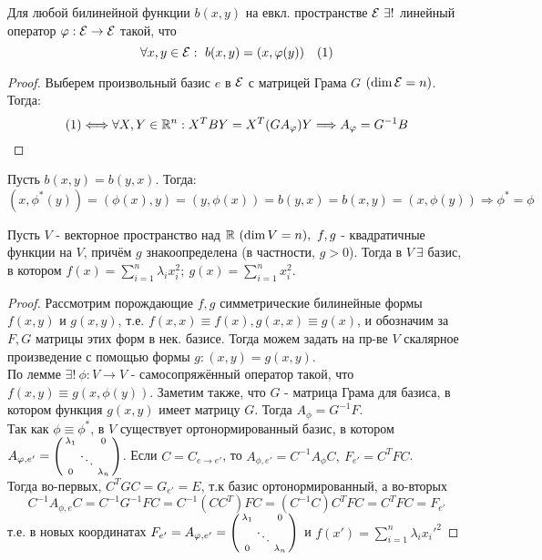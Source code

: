 \begin{lemma}
    Для любой билинейной функции $b(x, y)$ на евкл. пространстве $\mathcal{E} \ \exists!$ линейный оператор $\varphi: \mathcal{E} \rightarrow \mathcal{E}$ такой, что
    $$\forall x, y \in \mathcal{E}: \ b(x, y) = (x, \varphi(y)) \ \ \ (1)$$
\end{lemma}
\begin{proof}
    Выберем произвольный базис $e$ в $\mathcal{E}$ с матрицей Грама $G$ $(\dim \mathcal{E} = n)$. Тогда:
    $$(1) \Longleftrightarrow \forall X, Y \in \mathbb{R}^n: X^TBY = X^T(GA_{\varphi})Y \Longrightarrow A_\varphi = G^{-1}B$$ 
\end{proof}
\begin{remark}
    Пусть $b(x, y) = b(y, x)$. Тогда:
    $$(x, \phi^*(y)) = (\phi(x), y) = (y, \phi(x)) = b(y, x) = b(x, y) = (x, \phi(y)) \Rightarrow \phi^* = \phi$$
\end{remark}
\begin{theorem}
    Пусть $V$ - векторное пространство над $\mathbb{R} \ (\dim V = n), \ f, g$ - квадратичные функции на $V$, причём $g$ знакоопределена (в частности, $g > 0$). Тогда в $V \ \exists$ базис, в котором $f(x) = \sum \limits_{i=1}^n \lambda_i x_i^2; \ g(x) = \sum \limits_{i=1}^n x_i^2$. 
\end{theorem}
\begin{proof}
    Рассмотрим порождающие $f, g$ симметрические билинейные формы $f(x, y)$ и $g(x, y)$, т.е. $f(x,x) \equiv f(x), g(x, x) \equiv g(x)$, и обозначим за $F,G$ матрицы этих форм в нек. базисе. Тогда можем задать на пр-ве $V$ скалярное произведение с помощью формы $g: (x,y) = g(x,y)$.\\
    По лемме $\exists! \ \phi: V\rightarrow V$ - самосопряжённый оператор такой, что $f(x, y) \equiv g(x, \phi(y))$. Заметим также, что $G$ - матрица Грама для базиса, в котором функция $g(x, y)$ имеет матрицу $G$. Тогда $A_\phi = G^{-1}F$.\\
    Так как $\phi \equiv \phi^*$, в $V$ существует ортонормированный базис, в котором $A_{\phi, e'} = \begin{psmallmatrix}  \lambda_1&\null&0 \\ \null&\ddots&\null \\ 0&\null&\lambda_n \end{psmallmatrix}$. Если $C = C_{e\rightarrow e'}$, то $A_{\phi, e'} = C^{-1}A_\phi C, \ F_{e'} = C^TFC$.\\
    Тогда во-первых, $C^TGC = G_{e'} = E$, т.к базис ортонормированный, а во-вторых
    $$C^{-1}A_{\phi, e}C = C^{-1}G^{-1}FC = C^{-1}(CC^T)FC = (C^{-1}C)C^TFC = C^TFC = F_{e'}$$
    т.е. в новых координатах $F_{e'} = A_{\phi, e'} = \begin{psmallmatrix}  \lambda_1&\null&0 \\ \null&\ddots&\null \\ 0&\null&\lambda_n \end{psmallmatrix}$ и $f(x') = \sum \limits_{i=1}^n \lambda_i {x_i'}^2$
\end{proof}
